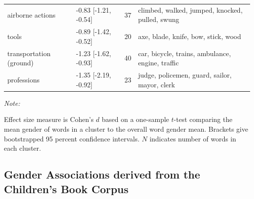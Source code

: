 \documentclass[english,,man,floatsintext]{apa6}
\begin{document}
\begin{table}
{\begin{threeparttable}
\begin{tabular}[t]{llrl}
\hspace{1em}airborne actions & -0.83 [-1.21, -0.54] & 37 & climbed, walked, jumped, knocked, pulled, swung\\
\hspace{1em}tools & -0.89 [-1.42, -0.52] & 20 & axe, blade, knife, bow, stick, wood\\
\hspace{1em}transportation (ground) & -1.23 [-1.62, -0.93] & 40 & car, bicycle, trains, ambulance, engine, traffic\\
\hspace{1em}professions & -1.35 [-2.19, -0.92] & 23 & judge, policemen, guard, sailor, mayor, clerk\\
\bottomrule
\end{tabular}
\begin{tablenotes}[para]
\item \textit{Note:} 
\item Effect size measure is Cohen's $d$ based on a one-sample $t$-test comparing the mean gender of words in a cluster to the overall word gender mean. Brackets give bootstrapped 95 percent confidence intervals. $N$ indicates number of words in each cluster.
\end{tablenotes}
\end{threeparttable}}
\end{table}

\hypertarget{gender-associations-derived-from-the-childrens-book-corpus}{%
\subsection{Gender Associations derived from the Children's Book Corpus}\label{gender-associations-derived-from-the-childrens-book-corpus}}
\end{document}
